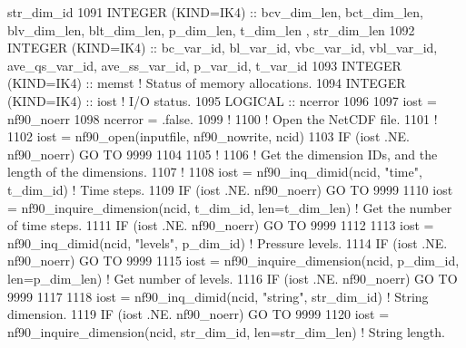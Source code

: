 \begin{DoxyCode}
      str\_dim\_id
1091     \textcolor{keywordtype}{INTEGER (KIND=IK4)}          :: bcv\_dim\_len, bct\_dim\_len, blv\_dim\_len, blt\_dim\_len, p\_dim\_len, t\_dim\_len
      , str\_dim\_len
1092     \textcolor{keywordtype}{INTEGER (KIND=IK4)}          :: bc\_var\_id, bl\_var\_id, vbc\_var\_id, vbl\_var\_id, ave\_qs\_var\_id, 
      ave\_ss\_var\_id, p\_var\_id, t\_var\_id
1093     \textcolor{keywordtype}{INTEGER (KIND=IK4)}          :: memst                                                \textcolor{comment}{! Status of memory
       allocations.}
1094     \textcolor{keywordtype}{INTEGER (KIND=IK4)}          :: iost                                                 \textcolor{comment}{! I/O status.}
1095     \textcolor{keywordtype}{LOGICAL}                     :: ncerror
1096 
1097     iost    = nf90\_noerr
1098     ncerror = .false.
1099     \textcolor{comment}{!}
1100     \textcolor{comment}{! Open the NetCDF file.}
1101     \textcolor{comment}{!}
1102     iost    = nf90\_open(inputfile, nf90\_nowrite, ncid)
1103     \textcolor{keywordflow}{IF} (iost .NE. nf90\_noerr) \textcolor{keywordflow}{GO TO} 9999
1104 
1105     \textcolor{comment}{!}
1106     \textcolor{comment}{! Get the dimension IDs, and the length of the dimensions.}
1107     \textcolor{comment}{!}
1108     iost    = nf90\_inq\_dimid(ncid, \textcolor{stringliteral}{"time"}, t\_dim\_id)                            \textcolor{comment}{! Time steps.}
1109     \textcolor{keywordflow}{IF} (iost .NE. nf90\_noerr) \textcolor{keywordflow}{GO TO} 9999
1110     iost    = nf90\_inquire\_dimension(ncid, t\_dim\_id, len=t\_dim\_len)             \textcolor{comment}{! Get the number of time
       steps.}
1111     \textcolor{keywordflow}{IF} (iost .NE. nf90\_noerr) \textcolor{keywordflow}{GO TO} 9999
1112 
1113     iost    = nf90\_inq\_dimid(ncid, \textcolor{stringliteral}{"levels"}, p\_dim\_id)                          \textcolor{comment}{! Pressure levels.}
1114     \textcolor{keywordflow}{IF} (iost .NE. nf90\_noerr) \textcolor{keywordflow}{GO TO} 9999
1115     iost    = nf90\_inquire\_dimension(ncid, p\_dim\_id, len=p\_dim\_len)             \textcolor{comment}{! Get number of levels.}
1116     \textcolor{keywordflow}{IF} (iost .NE. nf90\_noerr) \textcolor{keywordflow}{GO TO} 9999
1117 
1118     iost    = nf90\_inq\_dimid(ncid, \textcolor{stringliteral}{"string"}, str\_dim\_id)                        \textcolor{comment}{! String dimension.}
1119     \textcolor{keywordflow}{IF} (iost .NE. nf90\_noerr) \textcolor{keywordflow}{GO TO} 9999
1120     iost    = nf90\_inquire\_dimension(ncid, str\_dim\_id, len=str\_dim\_len)         \textcolor{comment}{! String length.}

\end{DoxyCode}
